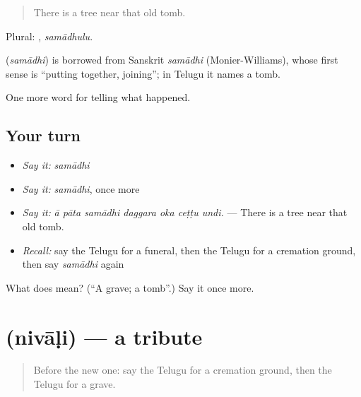 \begin{quote}
There is a tree near that old tomb.
\end{quote}

Plural: , \emph{samādhulu}.

\begin{cousinweb}
\textbf{} (\emph{samādhi}) is borrowed from Sanskrit \emph{samādhi} (Monier-Williams), whose first sense is \textquotedblleft{}putting together, joining\textquotedblright{}; in Telugu it names a tomb.
\end{cousinweb}

\begin{grammarlens}[title={What you've built}]
One more word for telling what happened.
\end{grammarlens}

\subsection*{Your turn}
\begin{itemize}
\raggedright
  \item \emph{Say it:} \emph{samādhi}
  \item \emph{Say it:} \emph{samādhi}, once more
  \item \emph{Say it:} \emph{ā pāta samādhi daggara oka ceṭṭu undi.} — There is a tree near that old tomb.
  \item \emph{Recall:} say the Telugu for a funeral, then the Telugu for a cremation ground, then say \emph{samādhi} again
\end{itemize}

\begin{tcolorbox}[breakable,colback=teal!4,colframe=teal!35!black,title={Before you move on}]
What does  mean? (\textquotedblleft{}A grave; a tomb\textquotedblright{}.) Say it once more.
\end{tcolorbox}
\section[\texorpdfstring{\te{నివాళి} (nivāḷi)}{నివాళి (nivāḷi)}]{ (nivāḷi) — a tribute}

\label{lesson:TE-C345-nivali}



\begin{quote}
Before the new one: say the Telugu for a cremation ground, then the Telugu for a grave.
\end{quote}

